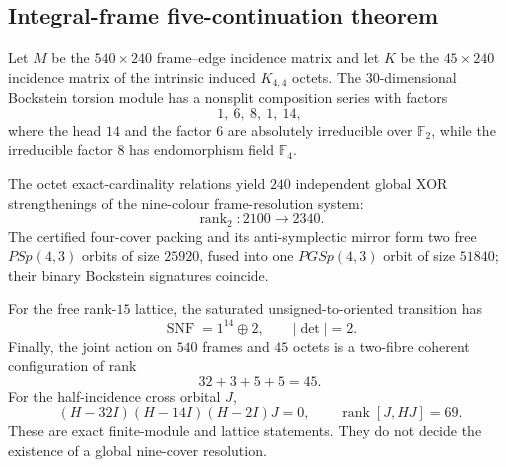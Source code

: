\subsection{Integral-frame five-continuation theorem}
Let $M$ be the $540\times240$ frame--edge incidence matrix and let $K$ be the
$45\times240$ incidence matrix of the intrinsic induced $K_{4,4}$ octets.
The $30$-dimensional Bockstein torsion module has a nonsplit composition series
with factors
\[
  1,\ 6,\ 8,\ 1,\ 14,
\]
where the head $14$ and the factor $6$ are absolutely irreducible over
$\mathbb F_2$, while the irreducible factor $8$ has endomorphism field
$\mathbb F_4$.

The octet exact-cardinality relations yield $240$ independent global XOR
strengthenings of the nine-colour frame-resolution system:
\[
  \operatorname{rank}_{2}:2100\longrightarrow2340.
\]
The certified four-cover packing and its anti-symplectic mirror form two free
$PSp(4,3)$ orbits of size $25920$, fused into one $PGSp(4,3)$ orbit of size
$51840$; their binary Bockstein signatures coincide.

For the free rank-$15$ lattice, the saturated unsigned-to-oriented transition
has
\[
  \operatorname{SNF}=1^{14}\oplus2,
  \qquad |\det|=2.
\]
Finally, the joint action on $540$ frames and $45$ octets is a two-fibre
coherent configuration of rank
\[
  32+3+5+5=45.
\]
For the half-incidence cross orbital $J$,
\[
  (H-32I)(H-14I)(H-2I)J=0,
  \qquad \operatorname{rank}[J,HJ]=69.
\]
These are exact finite-module and lattice statements.  They do not decide the
existence of a global nine-cover resolution.
